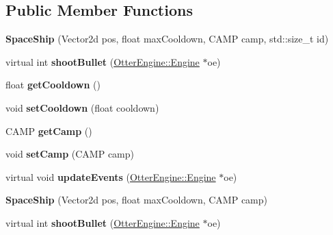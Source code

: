 \subsection*{Public Member Functions}
\begin{DoxyCompactItemize}
\item 
{\bfseries Space\+Ship} (Vector2d pos, float max\+Cooldown, C\+A\+MP camp, std\+::size\+\_\+t id)\hypertarget{class_space_ship_ad3486a9df30da6691a098ad7d5c0c32d}{}\label{class_space_ship_ad3486a9df30da6691a098ad7d5c0c32d}

\item 
virtual int {\bfseries shoot\+Bullet} (\hyperlink{class_otter_engine_1_1_engine}{Otter\+Engine\+::\+Engine} $\ast$oe)\hypertarget{class_space_ship_aebb9faaadd40076596c63c20b36294ad}{}\label{class_space_ship_aebb9faaadd40076596c63c20b36294ad}

\item 
float {\bfseries get\+Cooldown} ()\hypertarget{class_space_ship_a967819021b46d7494e9c12588eb32e52}{}\label{class_space_ship_a967819021b46d7494e9c12588eb32e52}

\item 
void {\bfseries set\+Cooldown} (float cooldown)\hypertarget{class_space_ship_a97a4e2985407f7d996a38e316eb7704b}{}\label{class_space_ship_a97a4e2985407f7d996a38e316eb7704b}

\item 
C\+A\+MP {\bfseries get\+Camp} ()\hypertarget{class_space_ship_a5317db59918565015cffb67420ec5f03}{}\label{class_space_ship_a5317db59918565015cffb67420ec5f03}

\item 
void {\bfseries set\+Camp} (C\+A\+MP camp)\hypertarget{class_space_ship_ad21697ffd5d06b836bbbb9e14234a584}{}\label{class_space_ship_ad21697ffd5d06b836bbbb9e14234a584}

\item 
virtual void {\bfseries update\+Events} (\hyperlink{class_otter_engine_1_1_engine}{Otter\+Engine\+::\+Engine} $\ast$oe)\hypertarget{class_space_ship_a679722051e189e10476612631f1658e5}{}\label{class_space_ship_a679722051e189e10476612631f1658e5}

\item 
{\bfseries Space\+Ship} (Vector2d pos, float max\+Cooldown, C\+A\+MP camp)\hypertarget{class_space_ship_a07aec713208803c471082ec7ab888a83}{}\label{class_space_ship_a07aec713208803c471082ec7ab888a83}

\item 
virtual int {\bfseries shoot\+Bullet} (\hyperlink{class_otter_engine_1_1_engine}{Otter\+Engine\+::\+Engine} $\ast$oe)\hypertarget{class_space_ship_ac56958e3849c468d109fc68c473fd607}{}\label{class_space_ship_ac56958e3849c468d109fc68c473fd607}


\end{DoxyCompactItemize}

